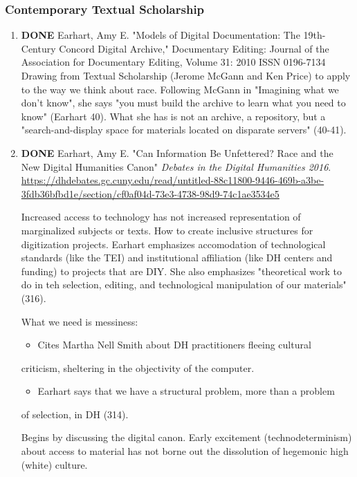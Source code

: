 \documentclass[11pt]{article}
\begin{document}
\subsubsection{Contemporary Textual Scholarship}
\label{sec:orgbbecf5d}
\begin{enumerate}
\item {\bfseries\sffamily DONE} Earhart, Amy E. "Models of Digital Documentation: The 19th-Century Concord Digital Archive," Documentary Editing: Journal of the Association for Documentary Editing, Volume 31: 2010 ISSN 0196-7134
\label{sec:org2ef754e}
Drawing from Textual Scholarship (Jerome McGann and Ken Price) to
apply to the way we think about race.  Following McGann in "Imagining
what we don't know", she says "you must build the archive to learn
what you need to know" (Earhart 40). What she has is not an archive, a
repository, but a "search-and-display space for materials located on
disparate servers" (40-41).

\item {\bfseries\sffamily DONE} Earhart, Amy E. "Can Information Be Unfettered? Race and the New
\label{sec:orgf7443ac}
Digital Humanities Canon" \emph{Debates in the Digital Humanities 2016}.
\url{https://dhdebates.gc.cuny.edu/read/untitled-88c11800-9446-469b-a3be-3fdb36bfbd1e/section/cf0af04d-73e3-4738-98d9-74c1ae3534e5} 

Increased access to technology has not increased representation of
marginalized subjects or texts. How to create inclusive structures for
digitization projects. Earhart emphasizes accomodation of
technological standards (like the TEI) and institutional affiliation
(like DH centers and funding) to projects that are DIY. She also
emphasizes "theoretical work to do in teh selection, editing, and
technological manipulation of our materials" (316).

What we need is messiness:
\begin{itemize}
\item Cites Martha Nell Smith about DH practitioners fleeing cultural
\end{itemize}
criticism, sheltering in the objectivity of the computer.
\begin{itemize}
\item Earhart says that we have a structural problem, more than a problem
\end{itemize}
of selection, in DH (314). 

Begins by discussing the digital canon. Early excitement
(technodeterminism) about access to material has not borne out the
dissolution of hegemonic high (white) culture.


\end{enumerate}
\end{document}
